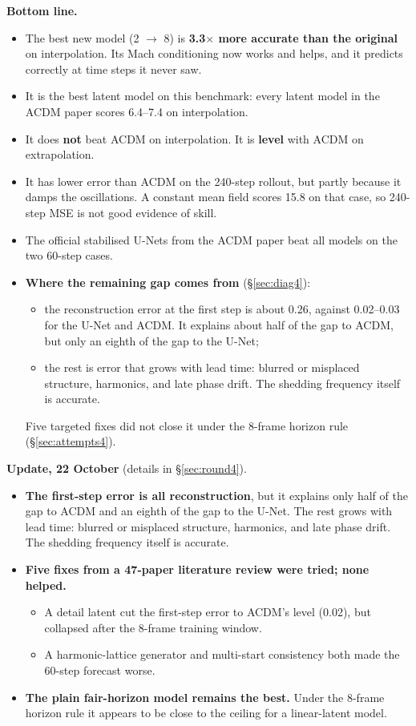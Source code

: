 \documentclass[10.5pt,a4paper]{article}
\newcommand{\good}[1]{\textbf{#1}}
\newcommand{\callout}[1]{\par\smallskip\noindent\colorbox{note}{\parbox{\dimexpr\linewidth-2\fboxsep}{\small #1}}\par\smallskip}
\begin{document}
\textbf{Bottom line.}
\begin{itemize}
\item The best new model (2 $\to$ 8) is \good{3.3$\times$ more accurate than the original} on
  interpolation. Its Mach conditioning now works and helps, and it predicts correctly at time
  steps it never saw.
\item It is the best latent model on this benchmark: every latent model in the ACDM paper
  scores 6.4--7.4 on interpolation.
\item It does \textbf{not} beat ACDM on interpolation. It is \textbf{level} with ACDM on
  extrapolation.
\item It has lower error than ACDM on the 240-step rollout, but partly because it damps the
  oscillations. A constant mean field scores 15.8 on that case, so 240-step MSE is not good
  evidence of skill.
\item The official stabilised U-Nets from the ACDM paper beat all models on the two 60-step
  cases.
\item \textbf{Where the remaining gap comes from} (\S\ref{sec:diag4}):
  \begin{itemize}
  \item the reconstruction error at the first step is about 0.26, against 0.02--0.03 for the
    U-Net and ACDM. It explains about half of the gap to ACDM, but only an eighth of the gap
    to the U-Net;
  \item the rest is error that grows with lead time: blurred or misplaced structure,
    harmonics, and late phase drift. The shedding frequency itself is accurate.
  \end{itemize}
  Five targeted fixes did not close it under the 8-frame horizon rule (\S\ref{sec:attempts4}).
\end{itemize}

\callout{\textbf{Update, 22 October} (details in \S\ref{sec:round4}).
\begin{itemize}
\item \textbf{The first-step error is all reconstruction}, but it explains only half of the
  gap to ACDM and an eighth of the gap to the U-Net. The rest grows with lead time: blurred
  or misplaced structure, harmonics, and late phase drift. The shedding frequency itself is
  accurate.
\item \textbf{Five fixes from a 47-paper literature review were tried; none helped.}
  \begin{itemize}
  \item A detail latent cut the first-step error to ACDM's level (0.02), but collapsed after
    the 8-frame training window.
  \item A harmonic-lattice generator and multi-start consistency both made the 60-step
    forecast worse.
  \end{itemize}
\item \textbf{The plain fair-horizon model remains the best.} Under the 8-frame horizon rule
  it appears to be close to the ceiling for a linear-latent model.
\end{itemize}}
\end{document}
